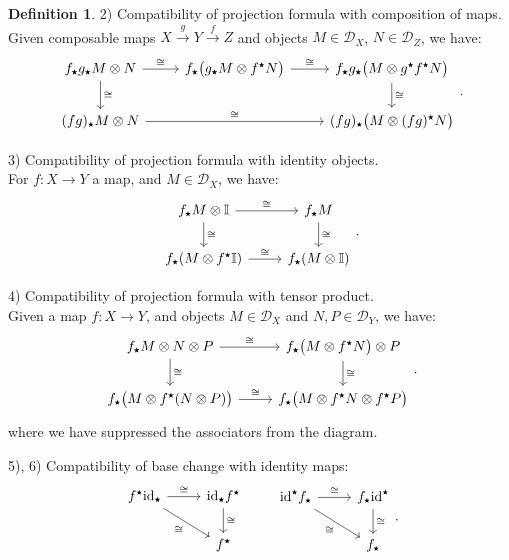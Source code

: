 \documentclass[10pt,a4paper,oneside]{amsart}
\theoremstyle{remark}
\theoremstyle{definition}
\newtheorem{definition}[theorem]{Definition}
\newcommand{\id}{\textnormal{id}}
\newcommand{\smsq}{{\mathbin{\vcenter{\hbox{\scalebox{0.45}{$\bigstar$}}}}}}
\newcommand{\pull}[1]{#1^\smsq}
\newcommand{\push}[1]{#1_\smsq}
\begin{document}
\begin{definition}
2) Compatibility of projection formula with composition of maps.\\
Given composable maps $X\stackrel g \to Y\stackrel f \to Z$ and objects $M\in\mathcal D_X$, $N\in\mathcal D_Z$, we have:
\[
\begin{tikzcd}
    \push{f}\push{g}M\otimes N \arrow[r,"\cong"]\arrow[d,"\cong"]&
    \push{f}\big(\push{g}M \otimes \pull{f}N\big) 
    \arrow[r,"\cong"]&
    \push{f}\push{g}\big(M\otimes \pull{g}\pull{f}N\big)\arrow[d,"\cong"]\\
    \push{(fg)}M\otimes N \arrow[rr,"\cong"]&&
    \push{(fg)}\big(M\otimes \pull{(fg)}N\big)
\end{tikzcd}.
\]

3) Compatibility of projection formula with identity objects.\\
For $f:X\to Y$ a map, and $M\in\mathcal D_X$, we have:
\[
\begin{tikzcd}
    \push{f}M\otimes \mathbb{I} \arrow[r,"\cong"]\arrow[d,"\cong"]& \push{f}M\arrow[d,"\cong"]\\
    \push{f}(M\otimes \pull{f}\mathbb{I})\arrow[r,"\cong"]& \push{f}(M \otimes \mathbb{I})
\end{tikzcd}.
\]

4) Compatibility of projection formula with tensor product.\\
Given a map $f:X\to Y$, and objects $M\in\mathcal D_X$ and  $N,P\in\mathcal D_Y$, we have:
\[
\begin{tikzcd}
    \push{f}M\otimes N \otimes P \arrow[r,"\cong"]\arrow[d,"\cong"]& \push{f}\big(M \otimes \pull{f}N \big)\otimes P \arrow[d,"\cong"]\\
    \push{f}\big(M \otimes \pull{f}(N\otimes P)\big) \arrow[r,"\cong"]& \push{f}\big(M \otimes \pull{f}N \otimes \pull{f}P \big)
\end{tikzcd}.
\]
where we have suppressed the associators from the diagram. 

5), 6) Compatibility of base change with identity maps:
\[
\begin{tikzcd}
    \pull{f} \push{\id} \arrow[r,"\cong"]\arrow[dr,"\cong"']&\push{\id}\pull{f}  \arrow[d,"\cong"]\\ & \pull{f}
\end{tikzcd}\qquad
\begin{tikzcd}
    \pull{\id} \push{f} \arrow[r,"\cong"]\arrow[dr,"\cong"']& \push{f}\pull{\id} \arrow[d,"\cong"]\\ & \push{f}
\end{tikzcd}.
\]


\end{definition}
\end{document}
